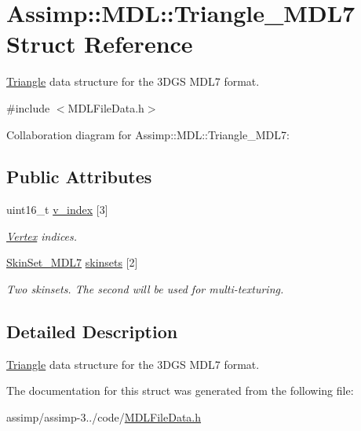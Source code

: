\hypertarget{struct_assimp_1_1_m_d_l_1_1_triangle___m_d_l7}{\section{Assimp\+:\+:M\+D\+L\+:\+:Triangle\+\_\+\+M\+D\+L7 Struct Reference}
\label{struct_assimp_1_1_m_d_l_1_1_triangle___m_d_l7}
}


\hyperlink{struct_assimp_1_1_m_d_l_1_1_triangle}{Triangle} data structure for the 3\+D\+G\+S M\+D\+L7 format.  




{\ttfamily \#include $<$M\+D\+L\+File\+Data.\+h$>$}



Collaboration diagram for Assimp\+:\+:M\+D\+L\+:\+:Triangle\+\_\+\+M\+D\+L7\+:
\subsection*{Public Attributes}
\begin{DoxyCompactItemize}
\item 
\hypertarget{struct_assimp_1_1_m_d_l_1_1_triangle___m_d_l7_a07e29746cfa834555f467d60b9e6e021}{uint16\+\_\+t \hyperlink{struct_assimp_1_1_m_d_l_1_1_triangle___m_d_l7_a07e29746cfa834555f467d60b9e6e021}{v\+\_\+index} \mbox{[}3\mbox{]}}\label{struct_assimp_1_1_m_d_l_1_1_triangle___m_d_l7_a07e29746cfa834555f467d60b9e6e021}

\begin{DoxyCompactList}\small\item\em \hyperlink{struct_assimp_1_1_m_d_l_1_1_vertex}{Vertex} indices. \end{DoxyCompactList}\item 
\hypertarget{struct_assimp_1_1_m_d_l_1_1_triangle___m_d_l7_a7c8891b1889ffab5ae35db0e8419b36b}{\hyperlink{struct_assimp_1_1_m_d_l_1_1_skin_set___m_d_l7}{Skin\+Set\+\_\+\+M\+D\+L7} \hyperlink{struct_assimp_1_1_m_d_l_1_1_triangle___m_d_l7_a7c8891b1889ffab5ae35db0e8419b36b}{skinsets} \mbox{[}2\mbox{]}}\label{struct_assimp_1_1_m_d_l_1_1_triangle___m_d_l7_a7c8891b1889ffab5ae35db0e8419b36b}

\begin{DoxyCompactList}\small\item\em Two skinsets. The second will be used for multi-\/texturing. \end{DoxyCompactList}\end{DoxyCompactItemize}


\subsection{Detailed Description}
\hyperlink{struct_assimp_1_1_m_d_l_1_1_triangle}{Triangle} data structure for the 3\+D\+G\+S M\+D\+L7 format. 

The documentation for this struct was generated from the following file\+:\begin{DoxyCompactItemize}
\item 
assimp/assimp-\/3../code/\hyperlink{_m_d_l_file_data_8h}{M\+D\+L\+File\+Data.\+h}\end{DoxyCompactItemize}
